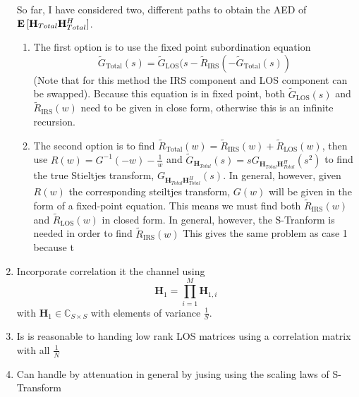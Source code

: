 \documentclass[12pt,a4paper]{report}
\begin{document}
\begin{enumerate}
So far, I have considered two, different paths to obtain the AED of $\mathop{\bf E{}}{[\mathbf{H}_{Total} \mathbf{H}_{Total}^H}]$. 
\begin{enumerate}
\item 
The first option is to use the fixed point subordination equation
\begin{equation}
\tilde{G}_{\text{Total}}(s) = \tilde{G}_{\text{LOS}}(s - \tilde{R}_{\text{IRS}}( - \tilde{G}_{\text{Total}}(s))
\end{equation} (Note that for this method the IRS component and LOS component can be swapped).
Because this equation is in fixed point, both $\tilde{G}_{\text{LOS}}(s)$ and $\tilde{R}_{\text{IRS}}(w)$ need to be given in close form, otherwise this is an infinite recursion. 
\item 
The second option is to find $\tilde{R}_{\text{Total}}(w) = \tilde{R}_{\text{IRS}}(w) + \tilde{R}_{\text{LOS}}(w)$, then use
$R(w) = G^{-1}(-w) - \frac{1}{w}$ and $\tilde{G}_{\mathbf{H}_{Total}}(s) = sG_{\mathbf{H}_{Total}\mathbf{H}_{Total}^H}(s^2)$ to find the true Stieltjes transform, $G_{\mathbf{H}_{Total}\mathbf{H}_{Total}^H}(s)$. In general, however, given $R(w)$ the corresponding steiltjes transform, $G(w)$ will be given in the form of a fixed-point equation. This means we must find both $\tilde{R}_{\text{IRS}}(w)$ and $\tilde{R}_{\text{LOS}}(w)$ in closed form.
In general, however, the S-Tranform is needed in order to find $\tilde{R}_{\text{IRS}}(w)$
This gives the same problem as case 1 because t
\end{enumerate}

 \item 
Incorporate correlation it the channel using 
	\begin{equation}
	\mathbf{H}_{1} =  \prod_{i=1}^{M} \mathbf{H}_{1,i}
	\end{equation}
 with $\mathbf{H}_{1}\in \mathbb{C}_{S \times S} $ with elements of variance $\frac{1}{S}$.
 
 \item
 Is is reasonable to handing low rank LOS matrices using a correlation matrix with all $\frac{1}{N}$
 
 \item 
Can handle by attenuation in general by jusing using the scaling laws of S-Transform
 

\end{enumerate}
\end{document}
